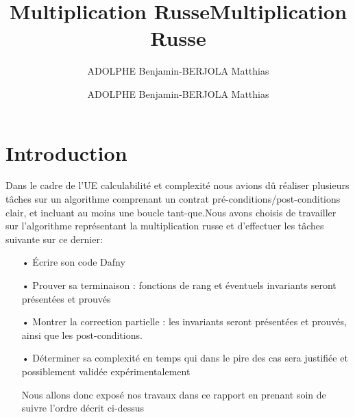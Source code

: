\documentclass[12pt,a4paper]{report}
\author{ADOLPHE Benjamin-BERJOLA Matthias}
\title{Multiplication Russe}
\begin{document}
\title{Multiplication Russe}
\author{ADOLPHE Benjamin-BERJOLA Matthias}


\maketitle 

\newpage
\chapter{Introduction}
\begin{large}
\begin{flushleft}
Dans le cadre de l'UE calculabilité et complexité nous avions dû réaliser plusieurs tâches sur un algorithme comprenant un contrat pré-conditions/post-conditions clair, et incluant au moins une boucle tant-que.Nous avons choisis de travailler sur l'algorithme représentant la multiplication russe et d'effectuer les tâches suivante sur ce dernier: 

\begin{itemize}
\item[•] Écrire son code Dafny
\medskip

\item[•] Prouver sa terminaison : fonctions de rang et éventuels invariants seront présentées et prouvés
\medskip 

\item[•] Montrer la  correction partielle : les invariants seront présentées et prouvés, ainsi que les post-conditions.
\medskip

\item[•] Déterminer sa complexité en temps qui dans le pire des cas sera justifiée et possiblement validée expérimentalement

\medskip

Nous allons donc exposé nos travaux dans ce rapport en prenant soin de suivre l'ordre décrit ci-dessus
\end{itemize}
\end{flushleft}
\end{large}

\end{document}
